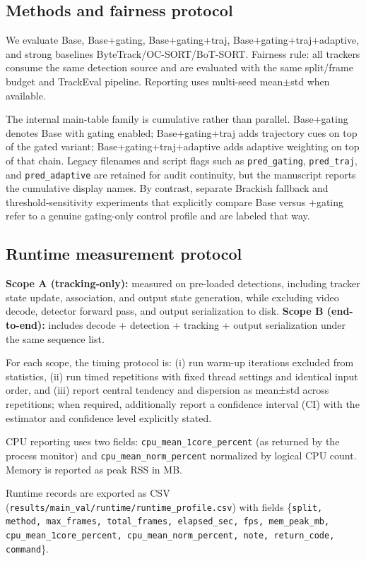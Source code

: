 \documentclass[5p,twocolumn,a4paper]{elsarticle}
\begin{document}
\subsection{Methods and fairness protocol}
We evaluate Base, Base+gating, Base+gating+traj, Base+gating+traj+adaptive, and strong baselines ByteTrack/OC-SORT/BoT-SORT. Fairness rule: all trackers consume the same detection source and are evaluated with the same split/frame budget and TrackEval pipeline. Reporting uses multi-seed mean$\pm$std when available.

The internal main-table family is cumulative rather than parallel. Base+gating denotes Base with gating enabled; Base+gating+traj adds trajectory cues on top of the gated variant; Base+gating+traj+adaptive adds adaptive weighting on top of that chain. Legacy filenames and script flags such as \texttt{pred\_gating}, \texttt{pred\_traj}, and \texttt{pred\_adaptive} are retained for audit continuity, but the manuscript reports the cumulative display names. By contrast, separate Brackish fallback and threshold-sensitivity experiments that explicitly compare Base versus +gating refer to a genuine gating-only control profile and are labeled that way.

\subsection{Runtime measurement protocol}
\textbf{Scope A (tracking-only):} measured on pre-loaded detections, including tracker state update, association, and output state generation, while excluding video decode, detector forward pass, and output serialization to disk. \textbf{Scope B (end-to-end):} includes decode + detection + tracking + output serialization under the same sequence list.

For each scope, the timing protocol is: (i) run warm-up iterations excluded from statistics, (ii) run timed repetitions with fixed thread settings and identical input order, and (iii) report central tendency and dispersion as mean±std across repetitions; when required, additionally report a confidence interval (CI) with the estimator and confidence level explicitly stated.

CPU reporting uses two fields: \texttt{cpu\_mean\_1core\_percent} (as returned by the process monitor) and \texttt{cpu\_mean\_norm\_percent} normalized by logical CPU count. Memory is reported as peak RSS in MB.

Runtime records are exported as CSV (\texttt{results/main\_val/runtime/runtime\_profile.csv}) with fields
\{\texttt{split, method, max\_frames, total\_frames, elapsed\_sec, fps, mem\_peak\_mb, cpu\_mean\_1core\_percent, cpu\_mean\_norm\_percent, note, return\_code, command}\}.
\end{document}
